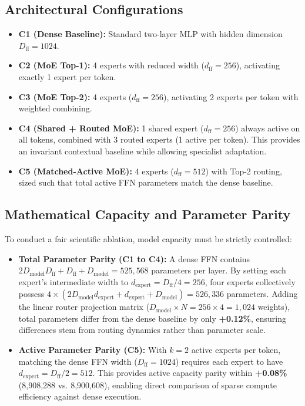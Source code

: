 \documentclass[11pt,a4paper]{article}
\begin{document}
\subsection{Architectural Configurations}
\begin{itemize}
    \item \textbf{C1 (Dense Baseline):} Standard two-layer MLP with hidden dimension $D_{\text{ff}} = 1024$.
    \item \textbf{C2 (MoE Top-1):} 4 experts with reduced width ($d_{\text{ff}} = 256$), activating exactly 1 expert per token.
    \item \textbf{C3 (MoE Top-2):} 4 experts ($d_{\text{ff}} = 256$), activating 2 experts per token with weighted combining.
    \item \textbf{C4 (Shared + Routed MoE):} 1 shared expert ($d_{\text{ff}} = 256$) always active on all tokens, combined with 3 routed experts (1 active per token). This provides an invariant contextual baseline while allowing specialist adaptation.
    \item \textbf{C5 (Matched-Active MoE):} 4 experts ($d_{\text{ff}} = 512$) with Top-2 routing, sized such that total active FFN parameters match the dense baseline.
\end{itemize}

\subsection{Mathematical Capacity and Parameter Parity}
To conduct a fair scientific ablation, model capacity must be strictly controlled:
\begin{itemize}
    \item \textbf{Total Parameter Parity (C1 to C4):} A dense FFN contains $2 D_{\text{model}} D_{\text{ff}} + D_{\text{ff}} + D_{\text{model}} = 525,568$ parameters per layer. By setting each expert's intermediate width to $d_{\text{expert}} = D_{\text{ff}} / 4 = 256$, four experts collectively possess $4 \times (2 D_{\text{model}} d_{\text{expert}} + d_{\text{expert}} + D_{\text{model}}) = 526,336$ parameters. Adding the linear router projection matrix ($D_{\text{model}} \times N = 256 \times 4 = 1,024$ weights), total parameters differ from the dense baseline by only \textbf{+0.12\%}, ensuring differences stem from routing dynamics rather than parameter scale.
    \item \textbf{Active Parameter Parity (C5):} With $k=2$ active experts per token, matching the dense FFN width ($D_{\text{ff}} = 1024$) requires each expert to have $d_{\text{expert}} = D_{\text{ff}} / 2 = 512$. This provides active capacity parity within \textbf{+0.08\%} (8,908,288 vs. 8,900,608), enabling direct comparison of sparse compute efficiency against dense execution.
\end{itemize}
\end{document}

